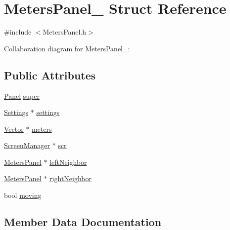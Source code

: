 \hypertarget{structMetersPanel__}{}\section{Meters\+Panel\+\_\+ Struct Reference}
\label{structMetersPanel__}


{\ttfamily \#include $<$Meters\+Panel.\+h$>$}



Collaboration diagram for Meters\+Panel\+\_\+\+:
\subsection*{Public Attributes}
\begin{DoxyCompactItemize}
\item 
\hyperlink{Panel_8h_a034d4c16521db412dc7a1e8536d16fae}{Panel} \hyperlink{structMetersPanel___a5e17d186eb42e06f29d3cb2bee137638}{super}
\item 
\hyperlink{Settings_8h_ad97e5960b63f21c02bf5e0e43c0ef002}{Settings} $\ast$ \hyperlink{structMetersPanel___a0586779c31d030c47ac8693cc9cf93a0}{settings}
\item 
\hyperlink{Vector_8h_a8297b82ce917cd21838596b7e3a7faa8}{Vector} $\ast$ \hyperlink{structMetersPanel___a782d5ea3a4014a4e302c9754fd71970f}{meters}
\item 
\hyperlink{ScreenManager_8h_a798c9c69dc8024a4c6829982bf94dddd}{Screen\+Manager} $\ast$ \hyperlink{structMetersPanel___a7eb59560f575b8bbb1def374f87a70aa}{scr}
\item 
\hyperlink{MetersPanel_8h_ac168f5e3e3c144e958020ce7b0ed33a3}{Meters\+Panel} $\ast$ \hyperlink{structMetersPanel___a1ba1ef2fe690f5ac06210391bf80efd5}{left\+Neighbor}
\item 
\hyperlink{MetersPanel_8h_ac168f5e3e3c144e958020ce7b0ed33a3}{Meters\+Panel} $\ast$ \hyperlink{structMetersPanel___a29f835bc9d020c4029fc787cb62e2404}{right\+Neighbor}
\item 
bool \hyperlink{structMetersPanel___aa5c86908cd7f535aee09e1125a8ddde9}{moving}
\end{DoxyCompactItemize}


\subsection{Member Data Documentation}
\mbox{\label{structMetersPanel___a1ba1ef2fe690f5ac06210391bf80efd5}} 
